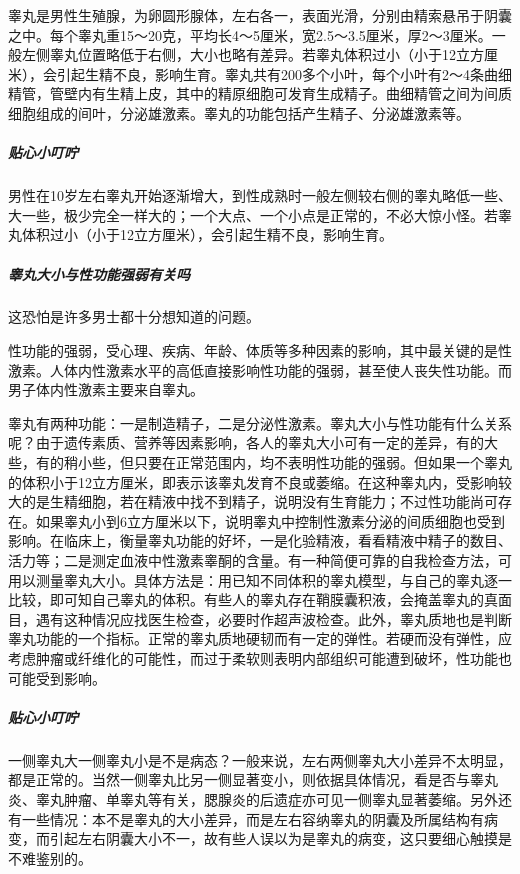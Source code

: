 睾丸是男性生殖腺，为卵圆形腺体，左右各一，表面光滑，分别由精索悬吊于阴囊之中。每个睾丸重15～20克，平均长4～5厘米，宽2.5～3.5厘米，厚2～3厘米。一般左侧睾丸位置略低于右侧，大小也略有差异。若睾丸体积过小（小于12立方厘米），会引起生精不良，影响生育。睾丸共有200多个小叶，每个小叶有2～4条曲细精管，管壁内有生精上皮，其中的精原细胞可发育生成精子。曲细精管之间为间质细胞组成的间叶，分泌雄激素。睾丸的功能包括产生精子、分泌雄激素等。

\subparagraph{贴心小叮咛}

男性在10岁左右睾丸开始逐渐增大，到性成熟时一般左侧较右侧的睾丸略低一些、大一些，极少完全一样大的；一个大点、一个小点是正常的，不必大惊小怪。若睾丸体积过小（小于12立方厘米），会引起生精不良，影响生育。

\subparagraph{睾丸大小与性功能强弱有关吗}

这恐怕是许多男士都十分想知道的问题。

性功能的强弱，受心理、疾病、年龄、体质等多种因素的影响，其中最关键的是性激素。人体内性激素水平的高低直接影响性功能的强弱，甚至使人丧失性功能。而男子体内性激素主要来自睾丸。

睾丸有两种功能：一是制造精子，二是分泌性激素。睾丸大小与性功能有什么关系呢？由于遗传素质、营养等因素影响，各人的睾丸大小可有一定的差异，有的大些，有的稍小些，但只要在正常范围内，均不表明性功能的强弱。但如果一个睾丸的体积小于12立方厘米，即表示该睾丸发育不良或萎缩。在这种睾丸内，受影响较大的是生精细胞，若在精液中找不到精子，说明没有生育能力；不过性功能尚可存在。如果睾丸小到6立方厘米以下，说明睾丸中控制性激素分泌的间质细胞也受到影响。在临床上，衡量睾丸功能的好坏，一是化验精液，看看精液中精子的数目、活力等；二是测定血液中性激素睾酮的含量。有一种简便可靠的自我检查方法，可用以测量睾丸大小。具体方法是：用已知不同体积的睾丸模型，与自己的睾丸逐一比较，即可知自己睾丸的体积。有些人的睾丸存在鞘膜囊积液，会掩盖睾丸的真面目，遇有这种情况应找医生检查，必要时作超声波检查。此外，睾丸质地也是判断睾丸功能的一个指标。正常的睾丸质地硬韧而有一定的弹性。若硬而没有弹性，应考虑肿瘤或纤维化的可能性，而过于柔软则表明内部组织可能遭到破坏，性功能也可能受到影响。

\subparagraph{贴心小叮咛}

一侧睾丸大一侧睾丸小是不是病态？一般来说，左右两侧睾丸大小差异不太明显，都是正常的。当然一侧睾丸比另一侧显著变小，则依据具体情况，看是否与睾丸炎、睾丸肿瘤、单睾丸等有关，腮腺炎的后遗症亦可见一侧睾丸显著萎缩。另外还有一些情况：本不是睾丸的大小差异，而是左右容纳睾丸的阴囊及所属结构有病变，而引起左右阴囊大小不一，故有些人误以为是睾丸的病变，这只要细心触摸是不难鉴别的。

